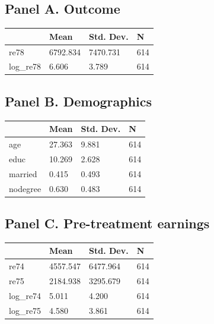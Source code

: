 \subsection{Panel A. Outcome}

\begin{tabular}{llll}
\toprule
 & Mean & Std. Dev. & N \\
\midrule
re78 & 6792.834 & 7470.731 & 614 \\
log_re78 & 6.606 & 3.789 & 614 \\
\bottomrule
\end{tabular}


\subsection{Panel B. Demographics}

\begin{tabular}{llll}
\toprule
 & Mean & Std. Dev. & N \\
\midrule
age & 27.363 & 9.881 & 614 \\
educ & 10.269 & 2.628 & 614 \\
married & 0.415 & 0.493 & 614 \\
nodegree & 0.630 & 0.483 & 614 \\
\bottomrule
\end{tabular}


\subsection{Panel C. Pre-treatment earnings}

\begin{tabular}{llll}
\toprule
 & Mean & Std. Dev. & N \\
\midrule
re74 & 4557.547 & 6477.964 & 614 \\
re75 & 2184.938 & 3295.679 & 614 \\
log_re74 & 5.011 & 4.200 & 614 \\
log_re75 & 4.580 & 3.861 & 614 \\
\bottomrule
\end{tabular}


